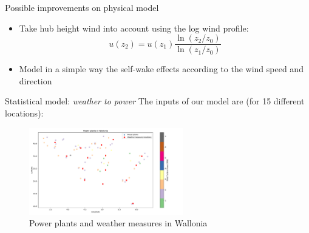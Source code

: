 \documentclass[12pt]{beamer}
\begin{document}
\begin{frame}{Possible improvements on physical model}
    \begin{itemize}
        \item Take hub height wind into account using the log wind profile: $$u(z_2) = u(z_1) \frac{\ln(z_2/z_0)}{\ln(z_1/z_0)}$$
        \item Model in a simple way the self-wake effects according to the wind speed and direction
    \end{itemize}
\end{frame}

\begin{frame}{Statistical model: \alert{\emph{weather to power}}}
    The inputs of our model are (for \num{15} different locations): 
    \begin{figure}
        \centering
        \includegraphics[width=0.6\textwidth]{resources/pdf/power_plants.pdf}
        \caption{Power plants and weather measures in Wallonia}
        \label{fig:power_plants}
    \end{figure}
\end{frame}
\end{document}
